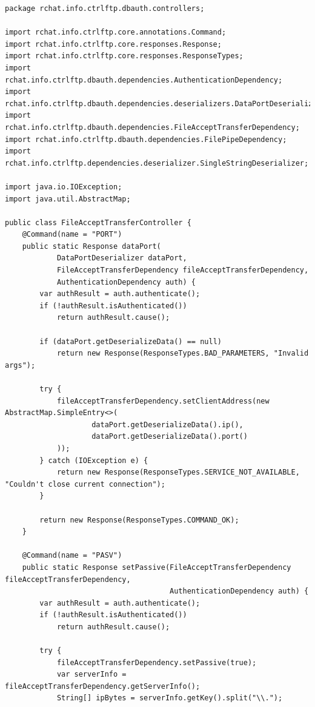 \documentclass[a4paper,14pt]{extarticle}
\begin{document}
\begin{verbatim}
package rchat.info.ctrlftp.dbauth.controllers;

import rchat.info.ctrlftp.core.annotations.Command;
import rchat.info.ctrlftp.core.responses.Response;
import rchat.info.ctrlftp.core.responses.ResponseTypes;
import rchat.info.ctrlftp.dbauth.dependencies.AuthenticationDependency;
import rchat.info.ctrlftp.dbauth.dependencies.deserializers.DataPortDeserializer;
import rchat.info.ctrlftp.dbauth.dependencies.FileAcceptTransferDependency;
import rchat.info.ctrlftp.dbauth.dependencies.FilePipeDependency;
import rchat.info.ctrlftp.dependencies.deserializer.SingleStringDeserializer;

import java.io.IOException;
import java.util.AbstractMap;

public class FileAcceptTransferController {
    @Command(name = "PORT")
    public static Response dataPort(
            DataPortDeserializer dataPort,
            FileAcceptTransferDependency fileAcceptTransferDependency,
            AuthenticationDependency auth) {
        var authResult = auth.authenticate();
        if (!authResult.isAuthenticated())
            return authResult.cause();

        if (dataPort.getDeserializeData() == null)
            return new Response(ResponseTypes.BAD_PARAMETERS, "Invalid args");

        try {
            fileAcceptTransferDependency.setClientAddress(new AbstractMap.SimpleEntry<>(
                    dataPort.getDeserializeData().ip(),
                    dataPort.getDeserializeData().port()
            ));
        } catch (IOException e) {
            return new Response(ResponseTypes.SERVICE_NOT_AVAILABLE, "Couldn't close current connection");
        }

        return new Response(ResponseTypes.COMMAND_OK);
    }

    @Command(name = "PASV")
    public static Response setPassive(FileAcceptTransferDependency fileAcceptTransferDependency,
                                      AuthenticationDependency auth) {
        var authResult = auth.authenticate();
        if (!authResult.isAuthenticated())
            return authResult.cause();

        try {
            fileAcceptTransferDependency.setPassive(true);
            var serverInfo = fileAcceptTransferDependency.getServerInfo();
            String[] ipBytes = serverInfo.getKey().split("\\.");


\end{verbatim}
\end{document}
